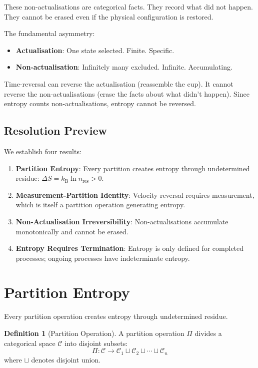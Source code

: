 \documentclass[twocolumn,10pt]{article}
\theoremstyle{definition}
\newtheorem{definition}[theorem]{Definition}
\theoremstyle{remark}
\newcommand{\kB}{k_{\mathrm{B}}}
\begin{document}
These non-actualisations are categorical facts. They record what did not happen. They cannot be erased even if the physical configuration is restored.

The fundamental asymmetry:
\begin{itemize}
\item \textbf{Actualisation}: One state selected. Finite. Specific.
\item \textbf{Non-actualisation}: Infinitely many excluded. Infinite. Accumulating.
\end{itemize}

Time-reversal can reverse the actualisation (reassemble the cup). It cannot reverse the non-actualisations (erase the facts about what didn't happen). Since entropy counts non-actualisations, entropy cannot be reversed.

\subsection{Resolution Preview}

We establish four results:
\begin{enumerate}
\item \textbf{Partition Entropy}: Every partition creates entropy through undetermined residue: $\Delta S = \kB \ln n_{\text{res}} > 0$.
\item \textbf{Measurement-Partition Identity}: Velocity reversal requires measurement, which is itself a partition operation generating entropy.
\item \textbf{Non-Actualisation Irreversibility}: Non-actualisations accumulate monotonically and cannot be erased.
\item \textbf{Entropy Requires Termination}: Entropy is only defined for completed processes; ongoing processes have indeterminate entropy.
\end{enumerate}

\section{Partition Entropy}
\label{sec:partition}

Every partition operation creates entropy through undetermined residue.

\begin{definition}[Partition Operation]
A partition operation $\Pi$ divides a categorical space $\mathcal{C}$ into disjoint subsets:
\begin{equation}
\Pi: \mathcal{C} \to \mathcal{C}_1 \sqcup \mathcal{C}_2 \sqcup \cdots \sqcup \mathcal{C}_n
\end{equation}
where $\sqcup$ denotes disjoint union.
\end{definition}
\end{document}

